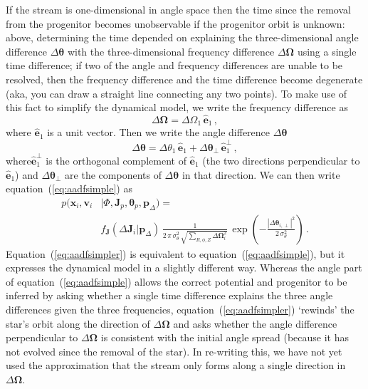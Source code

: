 \documentclass[12pt,preprint]{aastex}
\newcommand{\eqnname}{equation}
\newcommand{\Eqnname}{Equation}
\renewcommand{\vec}[1]{\ensuremath{\mathbf{#1}}}
\newcommand{\unitvec}[1]{\ensuremath{\mathbf{\hat{#1}}}}
\newcommand{\vecx}{\ensuremath{\vec{x}}}
\newcommand{\vecv}{\ensuremath{\vec{v}}}
\newcommand{\vecj}{\ensuremath{\vec{J}}}
\newcommand{\veco}{\ensuremath{\vec{\Omega}}}
\newcommand{\veca}{\ensuremath{\boldsymbol\theta}}
\newcommand{\paramsdiff}{\ensuremath{\vec{p}_\Delta}}
\begin{document}
If the stream is one-dimensional in angle space then the time since
the removal from the progenitor becomes unobservable if the progenitor
orbit is unknown: above, determining the time depended on explaining
the three-dimensional angle difference $\Delta \veca$ with the
three-dimensional frequency difference $\Delta \veco$ using a single
time difference; if two of the angle and frequency differences are
unable to be resolved, then the frequency difference and the time
difference become degenerate (aka, you can draw a straight line
connecting any two points). To make use of this fact to simplify the
dynamical model, we write the frequency difference as
\begin{equation}
  \Delta \veco = \Delta \Omega_1\,\unitvec{e}_1\,,
\end{equation}
where $\unitvec{e}_1$ is a unit vector. Then we write the angle
difference $\Delta \veca$ 
\begin{equation}
  \Delta \veca = \Delta \theta_1\,\unitvec{e}_1 + \Delta \veca_\perp\,\unitvec{e}_1^\perp\,,
\end{equation}
where$\unitvec{e}_1^\perp$ is the orthogonal complement of
$\unitvec{e}_1$ (the two directions perpendicular to $\unitvec{e}_1$)
and $\Delta \veca_\perp$ are the components of $\Delta \veca$ in that
direction. We can then write \eqnname~(\ref{eq:aadfsimple}) as
\begin{equation}\label{eq:aadfsimpler}
\begin{split}
  p(\vecx_i,\vecv_i & | \Phi,\vecj_p,\veca_p,\paramsdiff) 
   = \\
   & f_{\vecj}(\Delta \vecj_i|\paramsdiff) \,  \frac{1}{2\,\pi\,\sigma_\theta^2\,\sqrt{\sum_{R,\phi,Z}\Delta \veco_i^2}}\,\exp\left(-\frac{|\Delta\veca_{i,\perp}|^2}{2\,\sigma_\theta^2}\right)\,.
\end{split}
\end{equation}
\Eqnname~(\ref{eq:aadfsimpler}) is equivalent to
\eqnname~(\ref{eq:aadfsimple}), but it expresses the dynamical model
in a slightly different way. Whereas the angle part of
\eqnname~(\ref{eq:aadfsimple}) allows the correct potential and
progenitor to be inferred by asking whether a single time difference
explains the three angle differences given the three frequencies,
\eqnname~(\ref{eq:aadfsimpler}) `rewinds' the star's orbit along the
direction of $\Delta \veco$ and asks whether the angle difference
perpendicular to $\Delta \veco$ is consistent with the initial angle
spread (because it has not evolved since the removal of the star). In
re-writing this, we have not yet used the approximation that the
stream only forms along a single direction in $\Delta \veco$.
\end{document}
